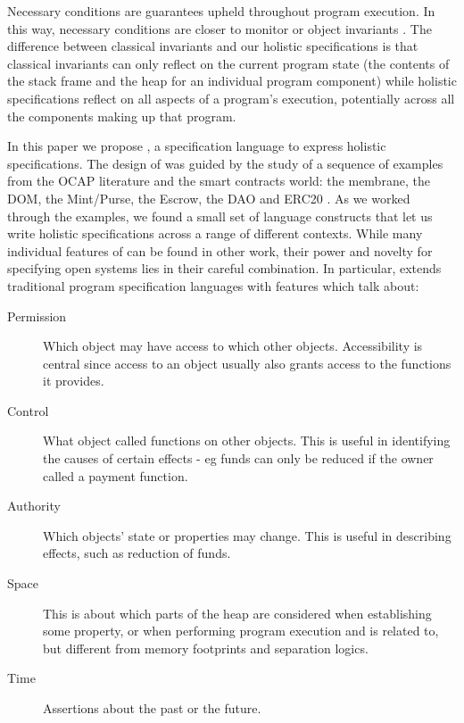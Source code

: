 Necessary conditions are guarantees upheld throughout program execution.
In this way, 
necessary conditions are closer to monitor or object
invariants \cite{Hoare74,Meyer97}. The difference between 
classical invariants and our holistic specifications is that classical invariants can only reflect  on
the current program state (\ie the contents of the
stack frame and the heap for an individual program component) while
holistic specifications reflect on all aspects of a program's
execution, potentially across all the components making up that program.


In this paper we propose \Chainmail, a specification language to
express holistic specifications.
The design of \Chainmail was guided by the study of a sequence of
examples from the OCAP literature and the smart contracts world: the
membrane, the DOM, the Mint/Purse, the Escrow, the DAO and
ERC20 \cite{cite-all-these-yet-again}.  As we worked through the
examples, we found a small set of language constructs that let us
write holistic specifications across a range of different contexts.
%
%
While many individual features of \Chainmail can be found in other work, 
their power and novelty for specifying open systems lies in their careful combination.
{}
%
In particular, \Chainmail extends 
traditional program specification languages\cite{Leavens-etal07,Meyer92} with features which talk about:

\begin{description}
\item[Permission] Which object may have access to which other objects. 
Accessibility is central since access to an object usually also grants access to the functions it provides.

\item[Control] What object called functions on other objects. This is useful in identifying the causes of certain effects - eg 
funds can only be reduced if the owner called a payment function.

\item[Authority]  Which objects' state or properties may change. This is useful in describing effects, such as reduction of funds.

\item[Space] This is about which parts of the heap are considered when establishing some property, or when 
performing program execution and is
related to, but different from memory footprints and separation logics.

\item[Time] Assertions about the past or the future.
\end{description}


